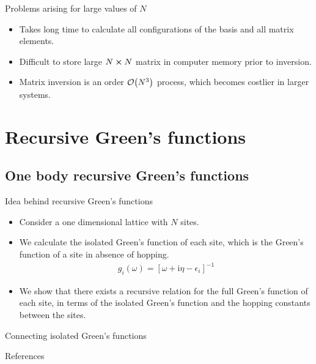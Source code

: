 \documentclass{beamer}
\newcommand{\I}{\mathrm{i}}
\begin{document}
\begin{frame}{Problems arising for large values of $ N $}
	\begin{itemize}
		\item Takes long time to calculate all configurations of the basis and all matrix elements.
		\item Difficult to store large $ N \cross N $ matrix in computer memory prior to inversion.
		\item Matrix inversion is an order $ \order{N^3} $ process, which becomes costlier in larger systems.
	\end{itemize}
\end{frame}

\section{Recursive Green's functions}
\subsection{One body recursive Green's functions}
	\begin{frame}{Idea behind recursive Green's functions}
		\begin{itemize}
			\item{
			Consider a one dimensional lattice with $ N $ sites.
			}
			\item {\pause
				We calculate the isolated Green's function of each site, which is the Green's function of a site in absence of hopping.
				\begin{align}
				g_{i} \left( \omega \right) = \left[ \omega + \I \eta - \epsilon_i \right]^{-1}
				\end{align}
				}
			\item{\pause
				We show that there exists a recursive relation for the full Green's function of each site, in terms of the isolated Green's function and the hopping constants between the sites.
				}
		\end{itemize}
	\end{frame}

\begin{frame}{Connecting isolated Green's functions}
	
\end{frame}

\begin{frame}{References}
	
	
\end{frame}
\end{document}
